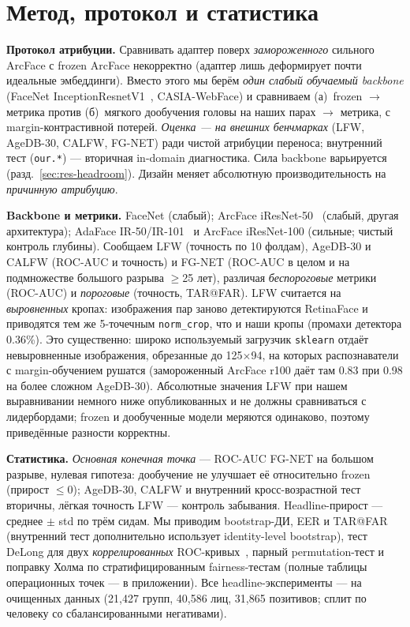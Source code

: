 \documentclass[10pt,twocolumn,letterpaper]{article}
\begin{document}
\section{Метод, протокол и статистика}\label{sec:method}
\textbf{Протокол атрибуции.} Сравнивать адаптер поверх \emph{замороженного} сильного ArcFace с frozen
ArcFace некорректно (адаптер лишь деформирует почти идеальные эмбеддинги). Вместо этого мы берём
\emph{один слабый обучаемый backbone} (FaceNet InceptionResnetV1~\cite{schroff2015facenet}, CASIA-WebFace)
и сравниваем (а)~frozen $\rightarrow$ метрика против (б)~мягкого дообучения головы на наших парах
$\rightarrow$ метрика, с margin-контрастивной потерей. \emph{Оценка — на внешних бенчмарках} (LFW,
AgeDB-30, CALFW, FG-NET) ради чистой атрибуции переноса; внутренний тест (\texttt{our.*}) — вторичная
in-domain диагностика. Сила backbone варьируется (разд.~\ref{sec:res-headroom}). Дизайн меняет
абсолютную производительность на \emph{причинную атрибуцию}.

\textbf{Backbone и метрики.} FaceNet (слабый); ArcFace iResNet-50~\cite{deng2019arcface} (слабый, другая
архитектура); AdaFace IR-50/IR-101~\cite{kim2022adaface} и ArcFace iResNet-100 (сильные; чистый контроль
глубины). Сообщаем LFW (точность по 10 фолдам), AgeDB-30 и CALFW (ROC-AUC и точность) и FG-NET (ROC-AUC
в целом и на подмножестве большого разрыва $\geq$25 лет), различая \emph{беспороговые} метрики (ROC-AUC) и \emph{пороговые} (точность, TAR@FAR). LFW считается на \emph{выровненных} кропах: изображения пар заново детектируются RetinaFace и приводятся тем же 5-точечным \texttt{norm\_crop}, что и наши кропы (промахи детектора 0.36\%). Это существенно: широко используемый загрузчик \texttt{sklearn} отдаёт невыровненные изображения, обрезанные до 125$\times$94, на которых распознаватели с margin-обучением рушатся (замороженный ArcFace r100 даёт там 0.83 при 0.98 на более сложном AgeDB-30). Абсолютные значения LFW при нашем выравнивании немного ниже опубликованных и не должны сравниваться с лидербордами; frozen и дообученные модели меряются одинаково, поэтому приведённые разности корректны.

\textbf{Статистика.} \emph{Основная конечная точка} — ROC-AUC FG-NET на большом разрыве, нулевая
гипотеза: дообучение не улучшает её относительно frozen (прирост $\leq 0$); AgeDB-30, CALFW и внутренний
кросс-возрастной тест вторичны, лёгкая точность LFW — контроль забывания. Headline-прирост — среднее
$\pm$ std по трём сидам. Мы приводим bootstrap-ДИ, EER и TAR@FAR (внутренний тест дополнительно использует
identity-level bootstrap), тест DeLong для двух \emph{коррелированных} ROC-кривых~\cite{delong1988},
парный permutation-тест и поправку Холма по стратифицированным fairness-тестам (полные таблицы
операционных точек — в приложении). Все headline-эксперименты — на очищенных данных (21{,}427 групп,
40{,}586 лиц, 31{,}865 позитивов; сплит по человеку со сбалансированными негативами).
\end{document}
